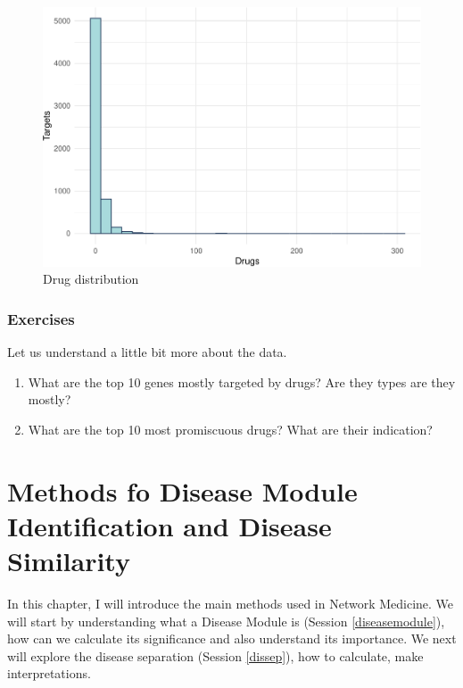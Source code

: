 \documentclass[
]{book}
\begin{document}
\begin{figure}
\centering
\includegraphics{NetMed_files/figure-latex/unnamed-chunk-19-1.pdf}
\caption{\label{fig:unnamed-chunk-19}Drug distribution}
\end{figure}

\hypertarget{exercises-2}{%
\subsection{Exercises}\label{exercises-2}}

Let us understand a little bit more about the data.

\begin{enumerate}
\def\labelenumi{\arabic{enumi}.}
\item
  What are the top 10 genes mostly targeted by drugs? Are they types are they mostly?
\item
  What are the top 10 most promiscuous drugs? What are their indication?
\end{enumerate}

\hypertarget{methods}{%
\chapter{Methods fo Disease Module Identification and Disease Similarity}\label{methods}}

In this chapter, I will introduce the main methods used in Network Medicine. We will start by understanding what a Disease Module is (Session \ref{diseasemodule}), how can we calculate its significance and also understand its importance. We next will explore the disease separation (Session \ref{dissep}), how to calculate, make interpretations.
\end{document}

